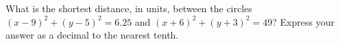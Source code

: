 What is the shortest distance, in units, between the circles $(x-9)^2+(y-5)^2=6.25$ and $(x+6)^2+(y+3)^2=49$? Express your answer as a decimal to the nearest tenth.
